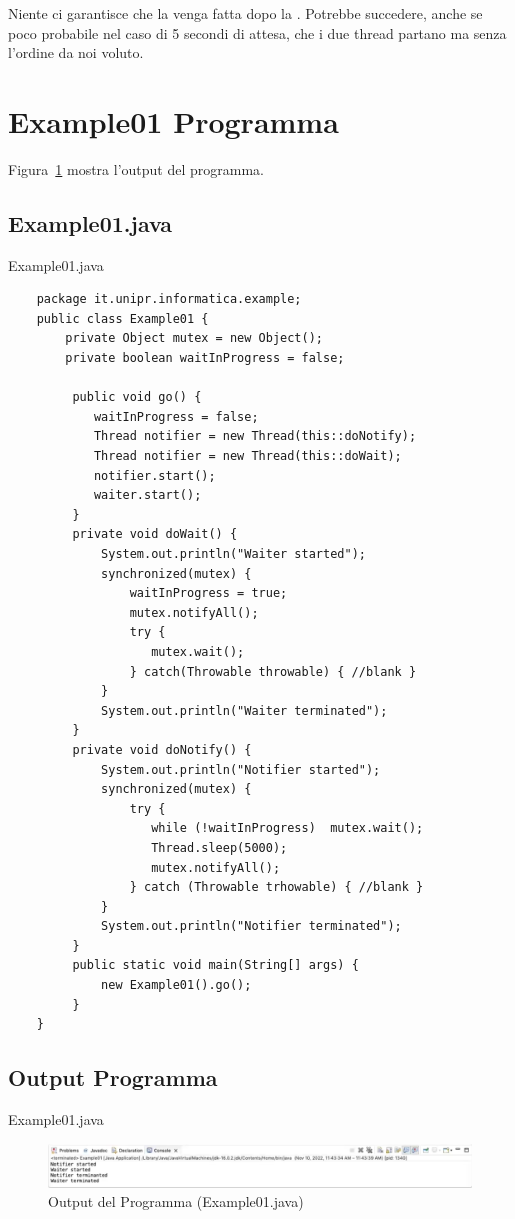 Niente ci garantisce che la  venga fatta dopo la . 
Potrebbe succedere, anche se poco probabile nel caso di 5 secondi di attesa, che i due thread
partano ma senza l'ordine da noi voluto. 

\section{Example01 Programma}
Figura~\ref{fig:two} mostra l'output del programma.

\subsection{Example01.java}
\begin{algorithm}[ht]
	\caption{Example01.java}
	\label{lst:genic_mpi}
	\begin{lstlisting}
    package it.unipr.informatica.example; 
    public class Example01 { 
        private Object mutex = new Object(); 
        private boolean waitInProgress = false; 
     
         public void go() { 
            waitInProgress = false; 
            Thread notifier = new Thread(this::doNotify); 
            Thread notifier = new Thread(this::doWait); 
            notifier.start(); 
            waiter.start(); 
         }   
         private void doWait() { 
             System.out.println("Waiter started"); 
             synchronized(mutex) { 
                 waitInProgress = true;
                 mutex.notifyAll();  
                 try { 
                    mutex.wait(); 
                 } catch(Throwable throwable) { //blank } 
             } 
             System.out.println("Waiter terminated"); 
         }  
         private void doNotify() { 
             System.out.println("Notifier started"); 
             synchronized(mutex) { 
                 try { 
                    while (!waitInProgress)  mutex.wait();  
                    Thread.sleep(5000); 
                    mutex.notifyAll(); 
                 } catch (Throwable trhowable) { //blank } 
             } 
             System.out.println("Notifier terminated");
         } 
         public static void main(String[] args) { 
             new Example01().go(); 
         } 
    } 
	\end{lstlisting}
\end{algorithm}

\subsection{Output Programma}{Example01.java}
\begin{figure}[ht]
	\centering
	\includegraphics[width=1.0\textwidth]{Immagini/output_code1.png}
	\caption{Output del Programma (Example01.java)}
	\label{fig:two}
\end{figure}


